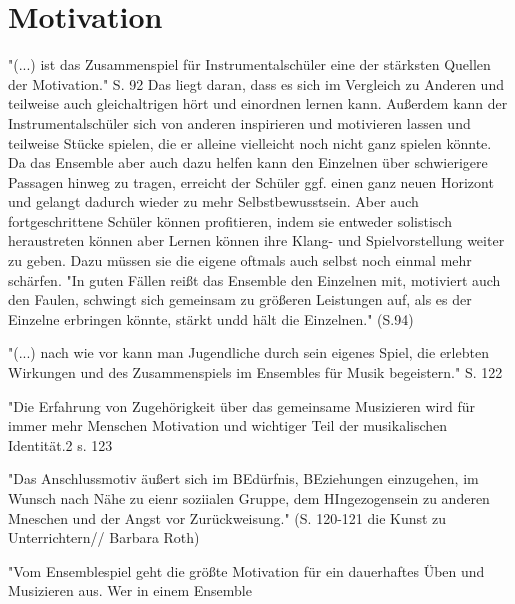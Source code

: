 \section{Motivation}

"(...) ist das Zusammenspiel für Instrumentalschüler eine der stärksten Quellen
der Motivation." S. 92 Das liegt daran, dass es sich im Vergleich zu Anderen und
teilweise auch gleichaltrigen hört und einordnen lernen kann. Außerdem kann der Instrumentalschüler
sich von anderen inspirieren und motivieren lassen und teilweise Stücke spielen,
die er alleine vielleicht noch nicht ganz spielen könnte. Da das Ensemble aber
auch dazu helfen kann den Einzelnen über schwierigere Passagen hinweg zu tragen,
erreicht der Schüler ggf. einen ganz neuen Horizont und gelangt dadurch wieder
zu mehr Selbstbewusstsein. Aber auch fortgeschrittene Schüler können
profitieren, indem sie entweder solistisch heraustreten können aber Lernen
können ihre Klang- und Spielvorstellung weiter zu geben. Dazu müssen sie die
eigene oftmals auch selbst noch einmal mehr schärfen. "In guten Fällen reißt das
Ensemble den Einzelnen mit, motiviert auch den Faulen, schwingt sich gemeinsam
zu größeren Leistungen auf, als es der Einzelne erbringen könnte, stärkt undd
hält die Einzelnen." (S.94)


"(...) nach wie vor kann man Jugendliche durch sein eigenes Spiel, die erlebten
Wirkungen und des Zusammenspiels im Ensembles für Musik begeistern." S. 122


"Die Erfahrung von Zugehörigkeit über das gemeinsame Musizieren wird für immer
mehr Menschen Motivation und wichtiger Teil der musikalischen Identität.2 s. 123

"Das Anschlussmotiv äußert sich im BEdürfnis, BEziehungen einzugehen, im Wunsch
nach Nähe zu eienr soziialen Gruppe, dem HIngezogensein zu anderen Mneschen und
der Angst vor Zurückweisung." (S. 120-121 die Kunst zu Unterrichtern// Barbara Roth)

"Vom Ensemblespiel geht die größte Motivation für ein dauerhaftes Üben und
Musizieren aus. Wer in einem Ensemble 
